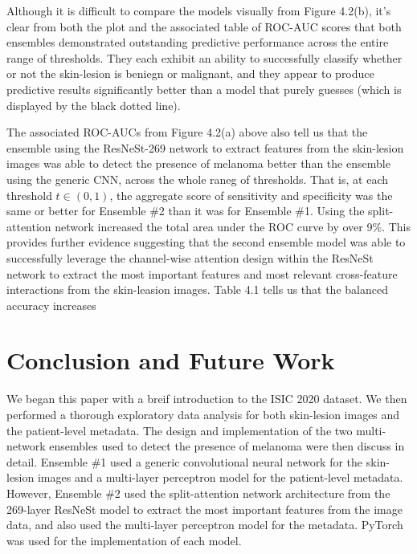 \documentclass [MAS] {uclathes}
\begin{document}
Although it is difficult to compare the models visually from Figure 4.2(b), it's clear from both the plot and the associated table of ROC-AUC scores that both ensembles demonstrated outstanding predictive performance across the entire range of thresholds. They each exhibit an ability to successfully classify whether or not the skin-lesion is beniegn or malignant, and they appear to produce predictive results significantly better than a model that purely guesses (which is displayed by the black dotted line).

The associated ROC-AUCs from Figure 4.2(a) above also tell us that the ensemble using the ResNeSt-269 network to extract features from the skin-lesion images was able to detect the presence of melanoma better than the ensemble using the generic CNN, across the whole raneg of thresholds. That is, at each threshold $t \in (0, 1)$, the aggregate score of sensitivity and specificity was the same or better for Ensemble \#2 than it was for Ensemble \#1. Using the split-attention network increased the total area under the ROC curve by over 9\%. This provides further evidence suggesting that the second ensemble model was able to successfully leverage the channel-wise attention design within the ResNeSt network to extract the most important features and most relevant cross-feature interactions from the skin-leasion images. Table 4.1 tells us that the balanced accuracy increases 

\chapter{Conclusion and Future Work}

We began this paper with a breif introduction to the ISIC 2020 dataset. We then performed a thorough exploratory data analysis for both skin-lesion images and the patient-level metadata. The design and implementation of the two multi-network ensembles used to detect the presence of melanoma were then discuss in detail. Ensemble \#1 used a generic convolutional neural network for the skin-lesion images and a multi-layer perceptron model for the patient-level metadata. However, Ensemble \#2 used the split-attention network architecture from the 269-layer ResNeSt model to extract the most important features from the image data, and also used the multi-layer perceptron model for the metadata. PyTorch was used for the implementation of each model.
\end{document}
